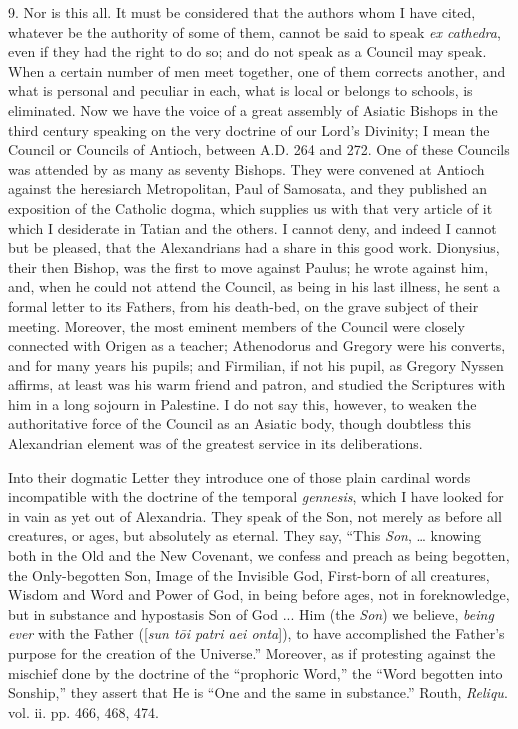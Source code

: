 9. Nor is this all. It must be considered that the authors whom I
have cited, whatever be the authority of some of them, cannot be said
to speak \emph{ex cathedra}, even if they had the right to do so; and
do not speak as a Council may speak. When a certain number of men meet
together, one of them corrects another, and what is personal and
peculiar in each, what is local or belongs to schools, is eliminated.
Now we have the voice of a great assembly of Asiatic Bishops in the
third century speaking on the very doctrine of our Lord's Divinity; I
mean the Council or Councils of Antioch, between A.D.
264 and 272. One of these Councils was attended by as many as seventy
Bishops. They were convened at Antioch against the heresiarch
Metropolitan, Paul of Samosata, and they published an exposition of
the Catholic dogma, which supplies us with that very article of it
which I desiderate in Tatian and the others. I cannot deny, and indeed
I cannot but be pleased, that the Alexandrians had a share in this
good work. Dionysius, their then Bishop, was the first to move against
Paulus; he wrote against him, and, when he could not attend the
Council, as being in his last illness, he sent a formal letter
to its Fathers, from his death-bed, on the grave subject of their
meeting. Moreover, the most eminent members of the Council were
closely connected with Origen as a teacher; Athenodorus and Gregory
were his converts, and for many years his pupils; and Firmilian, if
not his pupil, as Gregory Nyssen affirms, at least was his warm friend
and patron, and studied the Scriptures with him in a long sojourn in
Palestine. I do not say this, however, to weaken the authoritative
force of the Council as an Asiatic body, though doubtless this
Alexandrian element was of the greatest service in its deliberations.

Into their dogmatic Letter they introduce one of those plain
cardinal words incompatible with the doctrine of the temporal \emph{gennesis},
which I have looked for in vain as yet out of Alexandria. They speak
of the Son, not merely as before all creatures, or ages, but
absolutely as eternal. They say, ``This \emph{Son}, … knowing
both in the Old and the New Covenant, we confess and preach as being
begotten, the Only-begotten Son, Image of the Invisible God,
First-born of all creatures, Wisdom and Word and Power of God, in
being before ages, not in foreknowledge, but in substance and
hypostasis Son of God ... Him (the \emph{Son}) we believe, \emph{being
ever} with the Father ([\emph{sun t\={o}i patri aei onta}]), to
have accomplished the Father's purpose for the creation of the
Universe.'' Moreover, as if protesting against the mischief done
by the doctrine of the ``prophoric Word,'' the ``Word
begotten into Sonship,'' they assert that He is ``One and the
same in substance.'' Routh, \emph{Reliqu}. vol. ii. pp. 466, 468,
474.

